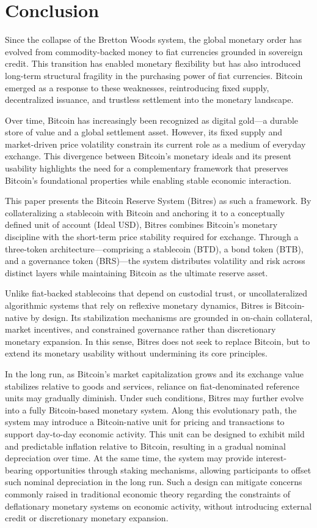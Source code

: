 \documentclass{article}
\begin{document}
\section{Conclusion}

Since the collapse of the Bretton Woods system, the global monetary order has evolved from commodity-backed money to fiat currencies grounded in sovereign credit. This transition has enabled monetary flexibility but has also introduced long-term structural fragility in the purchasing power of fiat currencies. Bitcoin emerged as a response to these weaknesses, reintroducing fixed supply, decentralized issuance, and trustless settlement into the monetary landscape.

Over time, Bitcoin has increasingly been recognized as digital gold---a durable store of value and a global settlement asset. However, its fixed supply and market-driven price volatility constrain its current role as a medium of everyday exchange. This divergence between Bitcoin's monetary ideals and its present usability highlights the need for a complementary framework that preserves Bitcoin's foundational properties while enabling stable economic interaction.

This paper presents the Bitcoin Reserve System (Bitres) as such a framework. By collateralizing a stablecoin with Bitcoin and anchoring it to a conceptually defined unit of account (Ideal USD), Bitres combines Bitcoin's monetary discipline with the short-term price stability required for exchange. Through a three-token architecture---comprising a stablecoin (BTD), a bond token (BTB), and a governance token (BRS)---the system distributes volatility and risk across distinct layers while maintaining Bitcoin as the ultimate reserve asset.

Unlike fiat-backed stablecoins that depend on custodial trust, or uncollateralized algorithmic systems that rely on reflexive monetary dynamics, Bitres is Bitcoin-native by design. Its stabilization mechanisms are grounded in on-chain collateral, market incentives, and constrained governance rather than discretionary monetary expansion. In this sense, Bitres does not seek to replace Bitcoin, but to extend its monetary usability without undermining its core principles.

In the long run, as Bitcoin's market capitalization grows and its exchange value stabilizes relative to goods and services, reliance on fiat-denominated reference units may gradually diminish. Under such conditions, Bitres may further evolve into a fully Bitcoin-based monetary system. Along this evolutionary path, the system may introduce a Bitcoin-native unit for pricing and transactions to support day-to-day economic activity. This unit can be designed to exhibit mild and predictable inflation relative to Bitcoin, resulting in a gradual nominal depreciation over time. At the same time, the system may provide interest-bearing opportunities through staking mechanisms, allowing participants to offset such nominal depreciation in the long run. Such a design can mitigate concerns commonly raised in traditional economic theory regarding the constraints of deflationary monetary systems on economic activity, without introducing external credit or discretionary monetary expansion.
\end{document}
